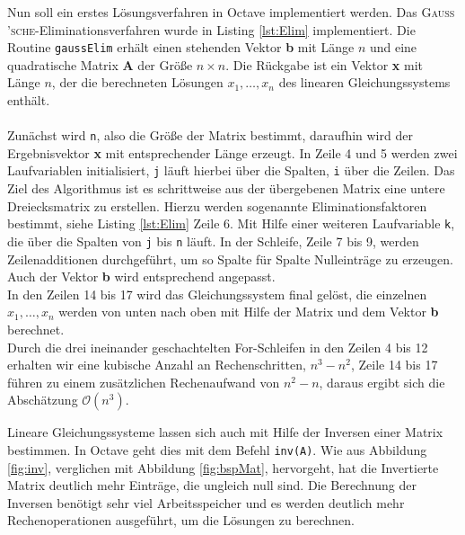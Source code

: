 Nun soll ein erstes Lösungsverfahren in Octave implementiert werden. Das \textsc{Gauss
'sche}-Eliminationsverfahren wurde in Listing \ref{lst:Elim} implementiert. Die Routine \texttt{gaussElim} erhält einen stehenden Vektor \textbf{b} mit Länge $n$ und eine quadratische Matrix \textbf{A} der Größe $n \times n$. Die Rückgabe ist ein Vektor \textbf{x} mit Länge $n$, der die berechneten Lösungen $x_{1}, \dots, x_{n}$ des linearen Gleichungssystems enthält.\\ \\
Zunächst wird \texttt{n}, also die Größe der Matrix bestimmt, daraufhin wird der Ergebnisvektor \textbf{x} mit entsprechender Länge erzeugt. In Zeile 4 und 5 werden zwei Laufvariablen initialisiert, \texttt{j} läuft hierbei über die Spalten, \texttt{i} über die Zeilen. Das Ziel des Algorithmus ist es schrittweise aus der übergebenen Matrix eine untere Dreiecksmatrix zu erstellen. Hierzu werden sogenannte Eliminationsfaktoren bestimmt, siehe Listing \ref{lst:Elim} Zeile 6. Mit Hilfe einer weiteren Laufvariable \texttt{k}, die über die Spalten von \texttt{j} bis \texttt{n} läuft. In der Schleife, Zeile 7 bis 9, werden Zeilenadditionen durchgeführt, um so Spalte für Spalte Nulleinträge zu erzeugen. Auch der Vektor \textbf{b} wird entsprechend angepasst. \\
In den Zeilen 14 bis 17 wird das Gleichungssystem final gelöst, die einzelnen $x_{1}, \dots, x_{n}$ werden von unten nach oben mit Hilfe der Matrix und dem Vektor \textbf{b} berechnet.  \\
Durch die drei ineinander geschachtelten For-Schleifen in den Zeilen 4 bis 12 erhalten wir eine kubische Anzahl an Rechenschritten, $n^{3}-n^{2}$, Zeile 14 bis 17 führen zu einem zusätzlichen Rechenaufwand von $n^{2}-n$, daraus ergibt sich die Abschätzung $\mathcal{O}(n^{3})$.
 
Lineare Gleichungssysteme lassen sich auch mit Hilfe der Inversen einer Matrix bestimmen. In Octave geht dies mit dem Befehl \texttt{inv(A)}. Wie aus Abbildung \ref{fig:inv}, verglichen mit Abbildung \ref{fig:bspMat}, hervorgeht, hat die Invertierte Matrix deutlich mehr Einträge, die ungleich null sind. Die Berechnung der Inversen benötigt sehr viel Arbeitsspeicher und es werden deutlich mehr Rechenoperationen ausgeführt, um die Lösungen zu berechnen.\\ \\

